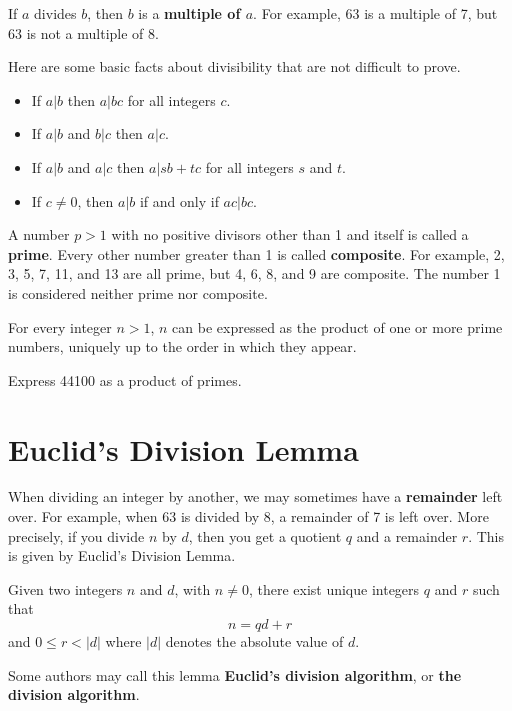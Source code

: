 If $a$ divides $b$, then $b$ is a \textbf{multiple of $a$}. For example, 63 is a multiple of 7, but 63 is not a multiple of 8.

Here are some basic facts about divisibility that are not difficult to prove.
\begin{itemize}
    \item If $a\vert b$ then $a\vert bc$ for all integers $c$.
    \item If $a\vert b$ and $b\vert c$ then $a\vert c$.
    \item If $a\vert b$ and $a\vert c$ then $a\vert sb+tc$ for all integers $s$ and $t$.
    \item If $c \neq 0$, then $a\vert b$ if and only if $ac\vert bc$.
\end{itemize}

A number $p > 1$ with no positive divisors other than 1 and itself is called a \textbf{prime}. Every other number greater than 1 is called \textbf{composite}. For example, 2, 3, 5, 7, 11, and 13 are all prime, but 4, 6, 8, and 9 are composite. The number 1 is considered neither prime nor composite.

\begin{theorem}\label{thrm-fundamental-theorem-of-arithmetic}
    For every integer $n > 1$, $n$ can be expressed as the product of one or more prime numbers, uniquely up to the order in which they appear.
\end{theorem}

\begin{exercise}
    Express 44100 as a product of primes.
\end{exercise}

\section{Euclid's Division Lemma}
When dividing an integer by another, we may sometimes have a \textbf{remainder} left over. For example, when 63 is divided by 8, a remainder of 7 is left over. More precisely, if you divide $n$ by $d$, then you get a quotient $q$ and a remainder $r$. This is given by Euclid's Division Lemma.
\begin{lemma}\label{lemma-euclid-division}
    Given two integers $n$ and $d$, with $n \neq 0$, there exist unique integers $q$ and $r$ such that
    \[
        n = qd + r
    \]
    and $0 \leq r < |d|$ where $|d|$ denotes the absolute value of $d$.
\end{lemma}
\begin{remark}
    Some authors may call this lemma \textbf{Euclid's division algorithm}, or \textbf{the division algorithm}.
\end{remark}

